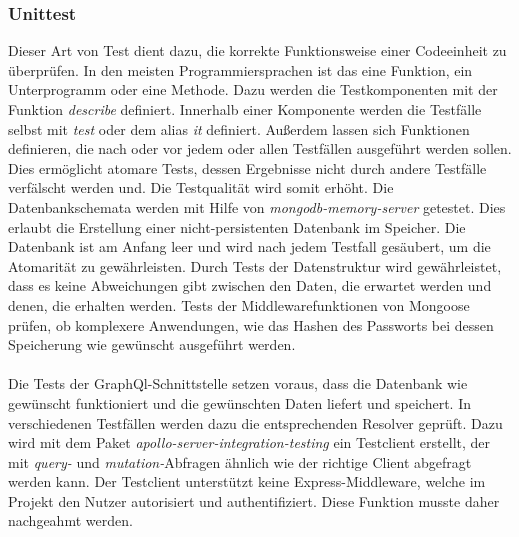 \subsubsection*{Unittest}
Dieser Art von Test dient dazu, die korrekte Funktionsweise einer Codeeinheit zu überprüfen. In den meisten Programmiersprachen ist das eine Funktion, ein Unterprogramm oder eine Methode. %
Dazu werden die Testkomponenten mit der Funktion \textit{describe} definiert. Innerhalb einer Komponente werden die Testfälle selbst mit \textit{test} oder dem alias \textit{it} definiert. Außerdem lassen sich Funktionen definieren, die nach oder vor jedem oder allen Testfällen ausgeführt werden sollen. Dies ermöglicht atomare Tests, dessen Ergebnisse nicht durch andere Testfälle verfälscht werden und. Die Testqualität wird somit erhöht. Die Datenbankschemata werden mit Hilfe von \textit{mongodb-memory-server} getestet. Dies erlaubt die Erstellung einer nicht-persistenten Datenbank im Speicher. Die Datenbank ist am Anfang leer und wird nach jedem Testfall gesäubert, um die Atomarität zu gewährleisten.
Durch Tests der Datenstruktur wird gewährleistet, dass es keine Abweichungen gibt zwischen den Daten, die erwartet werden und denen, die erhalten werden. Tests der Middlewarefunktionen von Mongoose prüfen, ob komplexere Anwendungen, wie das Hashen des Passworts bei dessen Speicherung wie gewünscht ausgeführt werden.
\\\\
Die Tests der GraphQl-Schnittstelle setzen voraus, dass die Datenbank wie gewünscht funktioniert und die gewünschten Daten liefert und speichert.
In verschiedenen Testfällen werden dazu die entsprechenden Resolver geprüft. Dazu wird mit dem Paket \textit{apollo-server-integration-testing} ein Testclient erstellt, der mit \textit{query-} und \textit{mutation-}Abfragen ähnlich wie der richtige Client abgefragt werden kann. Der Testclient unterstützt keine Express-Middleware, welche im Projekt den Nutzer autorisiert und authentifiziert. Diese Funktion musste daher nachgeahmt werden. 

